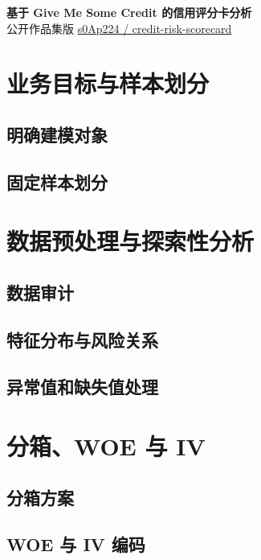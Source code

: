 \documentclass[UTF8,12pt,a4paper,fontset=windows]{ctexart}
\begin{document}
\begin{center}
  {\LARGE\bfseries 基于 Give Me Some Credit 的信用评分卡分析}\\[0.45em]
  {\small 公开作品集版 \quad \href{https://github.com/s0Ap224/credit-risk-scorecard}{s0Ap224 / credit-risk-scorecard}}
\end{center}
\vspace{0.3em}

\section{业务目标与样本划分}
\subsection{明确建模对象}


\subsection{固定样本划分}
\label{sec:sample-split}


\section{数据预处理与探索性分析}
\label{sec:module-two}
\subsection{数据审计}

\subsection{特征分布与风险关系}

\subsection{异常值和缺失值处理}
\label{sec:preprocessing}


\section{分箱、WOE 与 IV}
\subsection{分箱方案}
\label{sec:binning}


\subsection{WOE 与 IV 编码}
\label{sec:woe}

\end{document}
